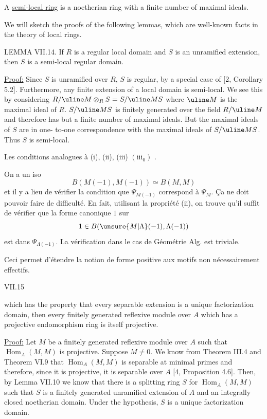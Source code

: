 A \uline{semi-local ring} is a noetherian ring with a finite number of
maximal ideals.

We will sketch the proofs of the following lemmas, which are
well-known facts in the theory of local rings.

LEMMA VII.14. If $R$ is a regular local domain and $S$ is an
unramified extension, then $S$ is a semi-local regular domain.

\uline{Proof:} Since $S$ is unramified over $R$, $S$ is regular, by a
special case of [2, Corollary 5.2]. Furthermore, any finite
extension of a local domain is semi-local. We see this by considering
$R/\uline M\otimes_R S=S/\uline M S$ where $\uline M$ is the maximal ideal of $R$. $S/\uline M S$ is
finitely generated over the field $R/\uline M$ and therefore has but a finite
number of maximal ideals. But the maximal ideals of $S$ are in one-
to-one correspondence with the maximal ideals of $S/\uline M S$. Thus $S$
is semi-local.

Les conditions  analogues à (i), (ii), (iii)
$(\mathrm{iii}_0)$ .

On a un iso
\[
B(M(-1),M(-1))\simeq B(M,M)
\]
et il y a lieu de vérifier la condition que $\Psi_{M(-1)}$ correspond à
$\Psi_M$. Ça ne doit pouvoir faire de difficulté.
En fait, utilisant la propriété (ii), on trouve qu'il suffit de vérifier que
la forme canonique $1$ sur
\[
1\in B(\unsure{M|\Lambda}(-1),\Lambda(-1))
\]
est dans $\Psi_{\Lambda(-1)}$.
 La vérification dans le cas de Géométrie Alg. est triviale.

Ceci permet d'étendre la notion de forme 
positive aux motifs non nécessairement effectifs.

VII.15

which has the property that every separable extension is a unique
factorization domain, then every finitely generated reflexive module
over $A$ which has a projective endomorphism ring is itself projective.

\uline{Proof:} Let $M$ be a finitely generated reflexive module over $A$
such that $\operatorname{Hom}_A(M,M)$ is projective. Suppose $M\neq0$. We know
from Theorem III.4 and Theorem VI.9 that $\operatorname{Hom}_A(M,M)$ is
separable at minimal primes and therefore, since it is projective,
it is separable over $A$ [4, Proposition 4.6]. Then, by Lemma VII.10
we know that there is a splitting ring $S$ for $\operatorname{Hom}_A(M,M)$ such that
$S$ is a finitely generated unramified extension of $A$ and an integrally
closed noetherian domain. Under the hypothesis, $S$ is a unique
factorization domain.

